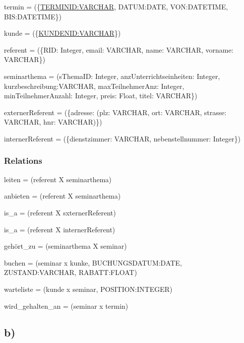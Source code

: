 \documentclass[10pt,a4paper]{report}
\begin{document}
termin  = (\{\underline{TERMINID:VARCHAR}, DATUM:DATE, VON:DATETIME, BIS:DATETIME\})

kunde   = (\{\underline{KUNDENID:VARCHAR}\})

referent = (\{RID: Integer, email: VARCHAR, name: VARCHAR, vorname: VARCHAR\})

seminarthema = (sThemaID: Integer, anzUnterrichtseinheiten: Integer, kurzbeschreibung:VARCHAR, maxTeilnehmerAnz: Integer, minTeilnehmerAnzahl: Integer, preis: Float, titel: VARCHAR\})

externerReferent = (\{adresse: (plz: VARCHAR, ort: VARCHAR, strasse: VARCHAR, hnr: VARCHAR)\})

internerReferent = (\{dienstzimmer: VARCHAR, nebenstellnummer: Integer\})

\subsubsection{Relations}

leiten = (referent X seminarthema)

anbieten = (referent X seminarthema)

is\_a = (referent X sxternerReferent)

is\_a = (referent X internerReferent)

gehört\_zu = (seminarthema X seminar)

buchen = (seminar x kunke, BUCHUNGSDATUM:DATE, ZUSTAND:VARCHAR, RABATT:FLOAT)

warteliste = (kunde x seminar, POSITION:INTEGER)

wird\_gehalten\_an = (seminar x termin)



\subsection{b)}
\end{document}
